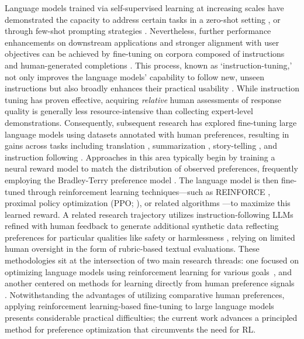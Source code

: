 Language models trained via self-supervised learning at increasing scales have demonstrated the capacity to address certain tasks in a zero-shot setting \citep{radford2019language}, or through few-shot prompting strategies \citep{gpt3,megatron,chowdhery2022palm}. Nevertheless, further performance enhancements on downstream applications and stronger alignment with user objectives can be achieved by fine-tuning on corpora composed of instructions and human-generated completions \citep{mishra-etal-2022-cross,sanh2022multitask,chung2022scaling,thoppilan2022lamda}. This process, known as `instruction-tuning,' not only improves the language models' capability to follow new, unseen instructions but also broadly enhances their practical usability \citep{chung2022scaling}. While instruction tuning has proven effective, acquiring \textit{relative} human assessments of response quality is generally less resource-intensive than collecting expert-level demonstrations. Consequently, subsequent research has explored fine-tuning large language models using datasets annotated with human preferences, resulting in gains across tasks including translation \citep{kreutzer-etal-2018-reliability}, summarization \citep{stiennon2022learning,ziegler2020finetuning}, story-telling \citep{ziegler2020finetuning}, and instruction following \citep{ouyang2022training,ramamurthy2023is}. Approaches in this area typically begin by training a neural reward model to match the distribution of observed preferences, frequently employing the Bradley-Terry preference model \citep{bradley1952rankanalysis}. The language model is then fine-tuned through reinforcement learning techniques—such as REINFORCE \citep{williams1992reinforce}, proximal policy optimization (PPO; \cite{schulman2017proximal}), or related algorithms \citep{ramamurthy2023is}—to maximize this learned reward. A related research trajectory utilizes instruction-following LLMs refined with human feedback to generate additional synthetic data reflecting preferences for particular qualities like safety or harmlessness \citep{bai2022constitutional}, relying on limited human oversight in the form of rubric-based textual evaluations. These methodologies sit at the intersection of two main research threads: one focused on optimizing language models using reinforcement learning for various goals~\citep{Ranzato2015SequenceLT,paulus2018a,wu2018learning}, and another centered on methods for learning directly from human preference signals \citep{christiano2017deep,kupcsik2018learning}. Notwithstanding the advantages of utilizing comparative human preferences, applying reinforcement learning-based fine-tuning to large language models presents considerable practical difficulties; the current work advances a principled method for preference optimization that circumvents the need for RL.

